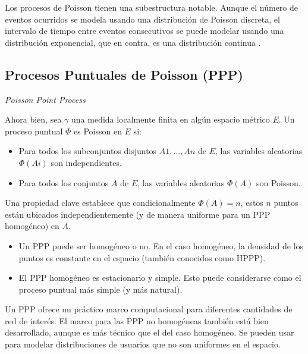 Los procesos de Poisson tienen una subestructura notable. Aunque el número de eventos ocurridos se modela usando una distribución de Poisson discreta, el intervalo de tiempo entre eventos consecutivos se puede modelar usando una distribución exponencial, que en contra, es una distribución continua \parencite{PoissonMedium}.\newline

\subsection{Procesos Puntuales de Poisson (PPP)}\label{PPP_C4}
\textit{Poisson Point Process} \parencite{Haenggi2009}\newline

Ahora bien, sea $\gamma$ una medida localmente finita en algún espacio métrico $E$. Un proceso puntual $\Phi $ es Poisson en $E$ si:

\begin{itemize}
    \item Para todos los subconjuntos disjuntos $A1, ..., An$ de $E$, las variables aleatorias $\Phi(Ai)$ son independientes.
    \item Para todos los conjuntos $A$ de $E$, las variables aleatorias $\Phi(A)$ son Poisson.
\end{itemize}

Una propiedad clave establece que condicionalmente $\Phi(A)= n$, estos $n$ puntos están ubicados independientemente (y de manera uniforme para un PPP homogéneo) en $A$.\newline

\begin{itemize}
    \item Un PPP puede ser homogéneo o no. En el caso homogéneo, la densidad de los puntos es constante en el espacio (también conocidos como HPPP).
    \item El PPP homogéneo es estacionario y simple. Esto puede considerarse como el proceso puntual más simple (y más natural).
\end{itemize}

Un PPP ofrece un práctico marco computacional para diferentes cantidades de red de interés. El marco para las PPP no homogéneas también está bien desarrollado, aunque es más técnico que el del caso homogéneo. Se pueden usar para modelar distribuciones de usuarios que no son uniformes en el espacio.\newline


